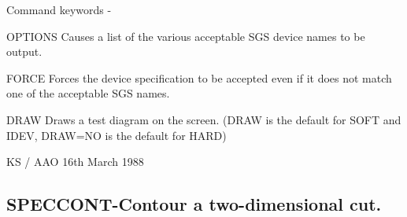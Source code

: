 \begin{description}
\begin{terminalv}
 Command keywords -

 OPTIONS  Causes a list of the various acceptable SGS device
          names to be output.

 FORCE    Forces the device specification to be accepted even
          if it does not match one of the acceptable SGS names.

 DRAW     Draws a test diagram on the screen.  (DRAW is the
          default for SOFT and IDEV, DRAW=NO is the default for
          HARD)

                                 KS / AAO 16th March 1988
\end{terminalv}
\end{description}
\subsection{SPECCONT-\label{SPECCONT}Contour a two-dimensional cut.}
